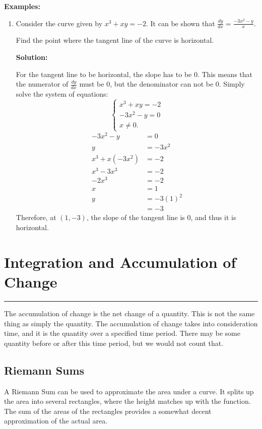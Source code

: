 \documentclass[12pt]{article}
\newcommand{\fline}{\par\noindent\rule{\textwidth}{0.1pt}} %
\begin{document}
\noindent \textbf{Examples:}
\begin{enumerate}
    \item Consider the curve given by $x^3 + xy = -2$. It can be shown that $\frac{dy}{dx} = \frac{-3x^2 - y}{x}$.

          Find the point where the tangent line of the curve is horizontal.
          \bigskip

          \textbf{Solution:}

          For the tangent line to be horizontal, the slope has to be $0$. This means that the numerator of $\frac{dy}{dx}$ must be $0$, but the denominator can not be $0$. Simply solve the system of equations:
          \[ \begin{cases}
                  x^3 + xy = -2 \\
                  -3x^2 - y = 0 \\
                  x \ne 0.
              \end{cases} \]
          \begin{align*}
              -3x^2 - y      & = 0       \\
              y              & = -3x^2   \\[6pt]
              x^3 + x(-3x^2) & = -2      \\
              x^3 - 3x^3     & = -2      \\
              -2x^3          & = -2      \\
              x              & = 1       \\[6pt]
              y              & = -3(1)^2 \\
                             & = -3
          \end{align*}
          Therefore, at $(1, -3)$, the slope of the tangent line is $0$, and thus it is horizontal.
\end{enumerate}

\section{Integration and Accumulation of Change}
\fline

The accumulation of change is the net change of a quantity. This is not the same thing as simply the quantity. The accumulation of change takes into consideration time, and it is the quantity over a specified time period. There may be some quantity before or after this time period, but we would not count that.

\subsection{Riemann Sums}
A Riemann Sum can be used to approximate the area under a curve. It splits up the area into several rectangles, where the height matches up with the function. The sum of the areas of the rectangles provides a somewhat decent approximation of the actual area.
\end{document}
